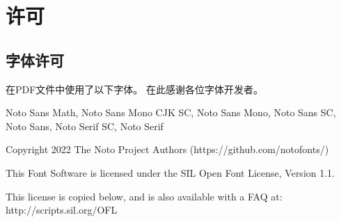 \chapter*{许可}

\section*{字体许可}

在PDF文件中使用了以下字体。
在此感谢各位字体开发者。

\vspace{1em}

Noto Sans Math, Noto Sans Mono CJK SC, Noto Sans Mono, Noto Sans SC, Noto Sans, Noto Serif SC, Noto Serif

Copyright 2022 The Noto Project Authors (https://github.com/notofonts/)

This Font Software is licensed under the SIL Open Font License,
Version 1.1.

This license is copied below, and is also available with a FAQ at:
http://scripts.sil.org/OFL

